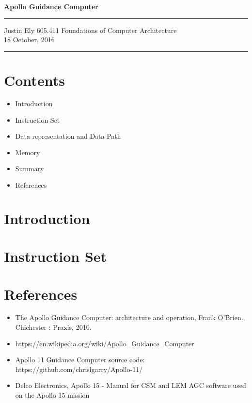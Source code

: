 \documentclass[a4paper,11pt]{article}
\begin{document}
\begin{flushright}

\vspace{1.1cm}

{\bf\Huge Apollo Guidance Computer}

\rule{0.25\linewidth}{0.5pt}

\vspace{0.5cm}
Justin Ely
\linebreak
\newline
\footnotesize{605.411 Foundations of Computer Architecture \\}
\vspace{0.5cm}
18 October, 2016
\end{flushright}

\noindent\rule{\linewidth}{1.0pt}



\section{Contents}
\begin{itemize}
\item Introduction %
\item Instruction Set
\item Data representation and Data Path
\item Memory
\item Summary
\item References
\end{itemize}


\section{Introduction}


\section{Instruction Set}


\section{References}

\begin{itemize}
  \item The Apollo Guidance Computer: architecture and operation, Frank O'Brien., Chichester : Praxis, 2010.
  \item https://en.wikipedia.org/wiki/Apollo\_Guidance\_Computer
  \item Apollo 11 Guidance Computer source code: https://github.com/chrislgarry/Apollo-11/
  \item Delco Electronics, Apollo 15 - Manual for CSM and LEM AGC software used on the Apollo 15 mission
\end{itemize}
\end{document}
